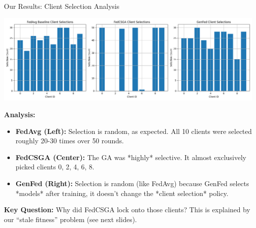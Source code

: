 \documentclass{beamer}
\begin{document}
\begin{frame}{Our Results: Client Selection Analysis}
\begin{center}
\includegraphics[width=\textwidth,height=0.45\textheight,keepaspectratio]{selections.png}
\end{center}

\textbf{Analysis:}
\begin{itemize}
    \item \textbf{FedAvg (Left):} Selection is random, as expected. All 10 clients were selected roughly 20-30 times over 50 rounds.
    \item \textbf{\textcolor{fedcsgaorange}{FedCSGA} (Center):} The GA was *highly* selective. It almost exclusively picked clients 0, 2, 4, 6, 8.
    \item \textbf{\textcolor{genfedblue}{GenFed} (Right):} Selection is random (like FedAvg) because GenFed selects *models* after training, it doesn't change the *client selection* policy.
\end{itemize}
\textbf{Key Question:} Why did FedCSGA lock onto those clients? This is explained by our ``stale fitness'' problem (see next slides).
\end{frame}
\end{document}
